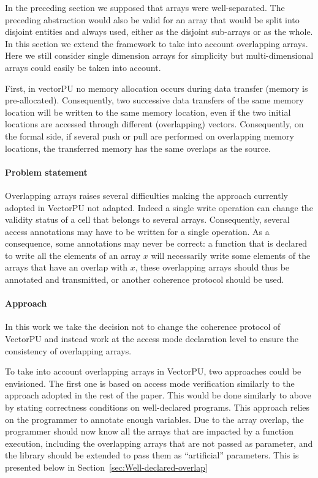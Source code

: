 \documentclass[preprint,12pt]{elsarticle}
\begin{document}
In the preceding section we supposed that arrays were well-separated. The preceding abstraction would also be valid for an array that would be split into disjoint entities and always used, either as the disjoint sub-arrays or as the whole. In this section we extend the framework to take into account overlapping arrays. Here we still consider single dimension arrays for simplicity but multi-dimensional arrays could easily be taken into account.

First, in vectorPU no memory allocation occurs during data transfer (memory is pre-allocated). Consequently, two successive data transfers of the same memory location will be written to the same memory location, even if the two initial locations are accessed through different (overlapping) vectors.
Consequently, on the formal side, if several push or pull are performed on overlapping memory locations, the transferred memory has the same overlaps as the source.

\paragraph{Problem statement}
Overlapping arrays raises several difficulties making the approach currently adopted in VectorPU not adapted. Indeed a single write operation can change the validity status of a cell that belongs to several arrays. Consequently, several access annotations may have to be written for a single operation. As a consequence, some annotations may never be correct: a function that is declared to write all the elements of an array $x$ will necessarily write some elements of the arrays that have an overlap with $x$, these overlapping arrays should thus be annotated and transmitted, or another coherence protocol should be used.

\paragraph{Approach}
In this work we take the decision not to change the coherence protocol of VectorPU and instead work at the access mode declaration level to ensure the consistency of overlapping arrays.

To take into account overlapping arrays in VectorPU, two approaches could be envisioned. The first one is based on access mode verification similarly to the approach adopted in the rest of the paper.  This would be done similarly to above by stating correctness conditions on well-declared programs. This approach relies on the programmer to annotate enough variables. Due to the array overlap, the programmer should now know all the arrays that are impacted by a function execution, including the overlapping arrays that are not passed as parameter, and the library should be extended to pass them as ``artificial'' parameters. This is presented below in Section~\ref{sec:Well-declared-overlap}
\end{document}
